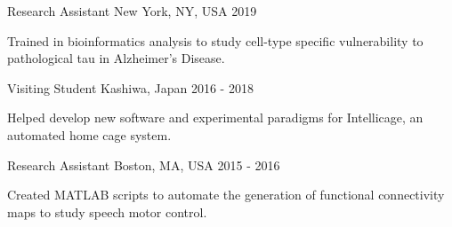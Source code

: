 %
%
%

\vspace*{0.35cm}

\begin{cventries}

    {Research Assistant}
    {New York, NY, USA}
    {2019}
    {\begin{cvitems}
        \item Trained in bioinformatics analysis to study cell-type specific vulnerability to pathological tau in Alzheimer's Disease.
    \end{cvitems}\vspace{1.5\baselineskip}}

    \vspace*{0.2cm}

    {Visiting Student}
    {Kashiwa, Japan}
    {2016 - 2018}
    {\begin{cvitems}
        \item Helped develop new software and experimental paradigms for Intellicage, an automated home cage system.
    \end{cvitems}\vspace{1.5\baselineskip}}

    \vspace*{0.2cm}

    {Research Assistant}
    {Boston, MA, USA}
    {2015 - 2016}
    {\begin{cvitems}
        \item Created MATLAB scripts to automate the generation of functional connectivity maps to study speech motor control.
    \end{cvitems}\vspace{1.5\baselineskip}}
    
\end{cventries}

\vspace*{-0.35cm}
